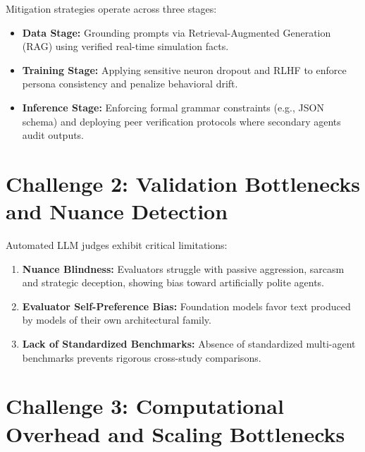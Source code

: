 \documentclass[12pt,a4paper]{report}
\begin{document}
Mitigation strategies operate across three stages:
\begin{itemize}
    \item \textbf{Data Stage:} Grounding prompts via Retrieval-Augmented Generation (RAG) using verified real-time simulation facts.
    \item \textbf{Training Stage:} Applying sensitive neuron dropout and RLHF to enforce persona consistency and penalize behavioral drift.
    \item \textbf{Inference Stage:} Enforcing formal grammar constraints (e.g., JSON schema) and deploying peer verification protocols where secondary agents audit outputs.
\end{itemize}

\section{Challenge 2: Validation Bottlenecks and Nuance Detection}
\label{sec:val_bottlenecks}

Automated LLM judges exhibit critical limitations:
\begin{enumerate}[label=\arabic*.]
    \item \textbf{Nuance Blindness:} Evaluators struggle with passive aggression, sarcasm and strategic deception, showing bias toward artificially polite agents.
    \item \textbf{Evaluator Self-Preference Bias:} Foundation models favor text produced by models of their own architectural family.
    \item \textbf{Lack of Standardized Benchmarks:} Absence of standardized multi-agent benchmarks prevents rigorous cross-study comparisons.
\end{enumerate}

\section{Challenge 3: Computational Overhead and Scaling Bottlenecks}
\label{sec:comp_bottlenecks}
\end{document}
